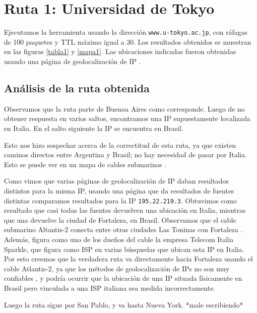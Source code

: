 \section{Ruta 1: Universidad de Tokyo}

Ejecutamos la herramienta usando la dirección \texttt{www.u-tokyo.ac.jp}, con ráfagas de 100 paquetes y TTL máximo igual a 30. Los resultados obtenidos se muestran en las figuras \ref{tabla1} y \ref{mapa1}. Las ubicaciones indicadas fueron obtenidas usando una página de geolocalización de IP \cite{ip2location}.

\subsection{Análisis de la ruta obtenida}
Observamos que la ruta parte de Buenoa Aires como corresponde. Luego de no obtener respuesta en varios saltos, encontramos una IP supuestamente localizada en Italia. En el salto siguiente la IP se encuentra en Brasil.

Esto nos hizo sospechar acerca de la correctitud de esta ruta, ya que existen caminos directos entre Argentina y Brasil; no hay necesidad de pasar por Italia. Esto se puede ver en un mapa de cables submarinos \cite{cables}.

Como vimos que varias páginas de geolocalización de IP daban resultados distintos para la misma IP, usando una página que da resultados de fuentes distintas \cite{iplocation} comparamos resultados para la IP \texttt{195.22.219.3}. Obtuvimos como resultado que casi todas las fuentes devuelven una ubicación en Italia, mientras que una devuelve la ciudad de Fortaleza, en Brasil. Observamos que el cable submarino Altantis-2 conecta entre otras ciudades Las Toninas con Fortaleza \cite{atlantis2}. Además, figura como uno de los dueños del cable la empresa Telecom Italia Sparkle, que figura como ISP en varias búsquedas que ubican esta IP en Italia. Por esto creemos que la verdadera ruta va directamente hacia Fortaleza usando el cable Atlantis-2, ya que los métodos de geolocalización de IPs no son muy confiables \cite{accuracy}, y podría ocurrir que la ubicación de una IP situada físicamente en Brasil pero vinculada a una ISP italiana sea medida incorrectamente.

Luego la ruta sigue por San Pablo, y va hasta Nueva York. *male escribiendo*



